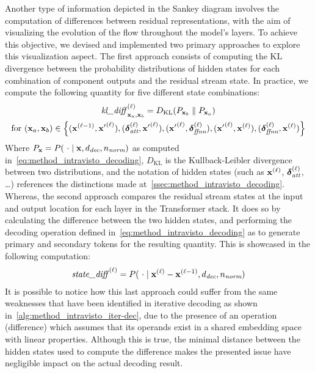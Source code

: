 Another type of information depicted in the Sankey diagram involves the computation of differences between residual representations, with the aim of visualizing the evolution of the flow throughout the model's layers.
To achieve this objective, we devised and implemented two primary approaches to explore this visualization aspect.
The first approach consists of computing the KL divergence between the probability distributions of hidden states for each combination of component outputs and the residual stream state.
In practice, we compute the following quantity for five different state combinations:
\begin{equation}
    \label{eq:method_intravisto_kl-diff}
    \begin{gathered}
        {\textit{kl\_diff}{\,}\strut}_{\bm{\mathbf{x}}_a, \bm{\mathbf{x}}_b}^{(\ell)} = D_{\text{KL}}(P_{\bm{\mathbf{x}}_b} \parallel P_{\bm{\mathbf{x}}_a}) \\
        \text{for} \ (\bm{\mathbf{x}}_a, \bm{\mathbf{x}}_b) \in \Bigl\{
            (\bm{\mathbf{x}}^{(\ell-1)}, {\bm{\mathbf{x}}'}^{(\ell)}), 
            (\bm{\mathbf{\delta}}_\textit{att}^{(\ell)}, {\bm{\mathbf{x}}'}^{(\ell)}), 
            ({\bm{\mathbf{x}}'}^{(\ell)}, \bm{\mathbf{\delta}}_\textit{ffnn}^{(\ell)}), 
            ({\bm{\mathbf{x}}'}^{(\ell)}, \bm{\mathbf{x}}^{(\ell)}), 
            (\bm{\mathbf{\delta}}_\textit{ffnn}^{(\ell)}, \bm{\mathbf{x}}^{(\ell)})
        \Bigr\}
    \end{gathered}
\end{equation}
Where $P_{\bm{\mathbf{x}}} = P(\ \cdot \mid \bm{\mathbf{x}}, d_\textit{dec}, n_\textit{norm})$ as computed in~\cref{eq:method_intravisto_decoding}, $D_{\text{KL}}$ is the Kullback-Leibler divergence between two distributions, and the notation of hidden states (such as $\bm{\mathbf{x}}^{(\ell)}$, $\bm{\mathbf{\delta}}_\textit{att}^{(\ell)}$, \ldots) references the distinctions made at~\cref{ssec:method_intravisto_decoding}.
Whereas, the second approach compares the residual stream states at the input and output location for each layer in the Transformer stack.
It does so by calculating the difference between the two hidden states, and performing the decoding operation defined in~\cref{eq:method_intravisto_decoding} as to generate primary and secondary tokens for the resulting quantity.
This is showcased in the following computation:
\begin{equation}
    \label{eq:method_intravisto_state-diff}
    {\textit{state\_diff}{\,}\strut}^{(\ell)} = P(\ \cdot \mid \bm{\mathbf{x}}^{(\ell)} - \bm{\mathbf{x}}^{(\ell - 1)}, d_\textit{dec}, n_\textit{norm})
\end{equation}
It is possible to notice how this last approach could suffer from the same weaknesses that have been identified in iterative decoding as shown in~\cref{alg:method_intravisto_iter-dec}, due to the presence of an operation (difference) which assumes that its operands exist in a shared embedding space with linear properties.
Although this is true, the minimal distance between the hidden states used to compute the difference makes the presented issue have negligible impact on the actual decoding result.

